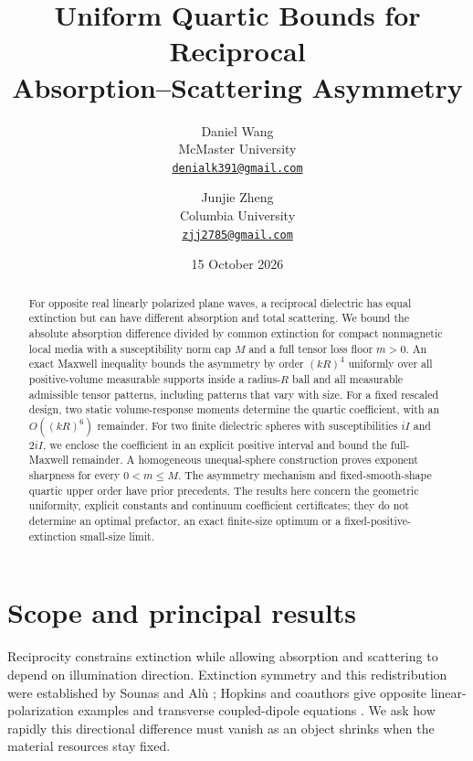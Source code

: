 \documentclass[11pt]{article}
\title{Uniform Quartic Bounds for Reciprocal\\Absorption--Scattering Asymmetry}
\author{Daniel Wang\\McMaster University\\\href{mailto:denialk391@gmail.com}{\texttt{denialk391@gmail.com}}
\and Junjie Zheng\\Columbia University\\\href{mailto:zjj2785@gmail.com}{\texttt{zjj2785@gmail.com}}}
\date{15 October 2026}
\begin{document}
\maketitle
\begin{abstract}
For opposite real linearly polarized plane waves, a reciprocal dielectric has equal extinction but can have different absorption and total scattering. We bound the absolute absorption difference divided by common extinction for compact nonmagnetic local media with a susceptibility norm cap $M$ and a full tensor loss floor $m>0$. An exact Maxwell inequality bounds the asymmetry by order $(kR)^4$ uniformly over all positive-volume measurable supports inside a radius-$R$ ball and all measurable admissible tensor patterns, including patterns that vary with size. For a fixed rescaled design, two static volume-response moments determine the quartic coefficient, with an $O((kR)^6)$ remainder. For two finite dielectric spheres with susceptibilities $iI$ and $2iI$, we enclose the coefficient in an explicit positive interval and bound the full-Maxwell remainder. A homogeneous unequal-sphere construction proves exponent sharpness for every $0<m\leq M$. The asymmetry mechanism and fixed-smooth-shape quartic upper order have prior precedents. The results here concern the geometric uniformity, explicit constants and continuum coefficient certificates; they do not determine an optimal prefactor, an exact finite-size optimum or a fixed-positive-extinction small-size limit.
\end{abstract}

\section{Scope and principal results}\label{sec:main}
Reciprocity constrains extinction while allowing absorption and scattering to depend on illumination direction. Extinction symmetry and this redistribution were established by Sounas and Al\`u \citep{SounasAlu2014}; Hopkins and coauthors give opposite linear-polarization examples and transverse coupled-dipole equations \citep{Hopkins2015}. We ask how rapidly this directional difference must vanish as an object shrinks when the material resources stay fixed.
\end{document}

